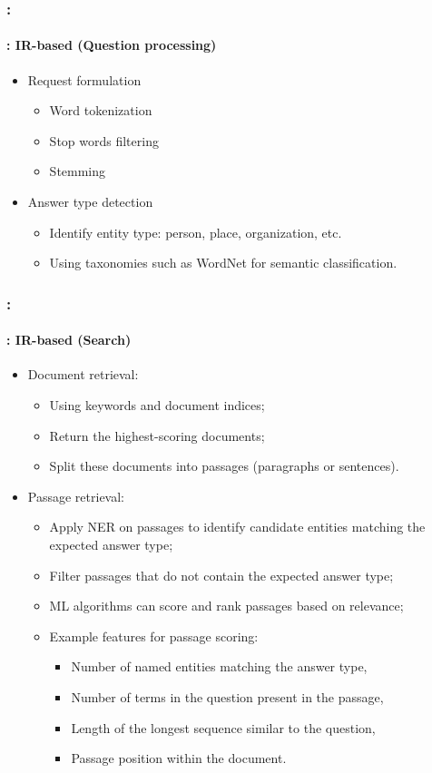 \documentclass[xcolor=table]{beamer}
\begin{document}
\begin{frame}
	\frametitle{\insertshortsubtitle: \insertsection}
	\framesubtitle{\insertsubsection: IR-based (Question processing)}
	
	\begin{itemize}
		\item Request formulation
		\begin{itemize}
			\item Word tokenization
			\item Stop words filtering
			\item Stemming
		\end{itemize}
		\item Answer type detection
		\begin{itemize}
			\item Identify entity type: person, place, organization, etc.
			\item Using taxonomies such as WordNet for semantic classification.
		\end{itemize}
	\end{itemize}
	
\end{frame}

\begin{frame}
	\frametitle{\insertshortsubtitle: \insertsection}
	\framesubtitle{\insertsubsection: IR-based (Search)}
	
	\begin{itemize}
		\item Document retrieval:
		\begin{itemize}
			\item Using keywords and document indices;
			\item Return the highest-scoring documents;
			\item Split these documents into passages (paragraphs or sentences).
		\end{itemize}
		\item Passage retrieval:
		\begin{itemize}
			\item Apply NER on passages to identify candidate entities matching the expected answer type;
			\item Filter passages that do not contain the expected answer type;
			\item ML algorithms can score and rank passages based on relevance;
			\item Example features for passage scoring:
			\begin{itemize}
				\item Number of named entities matching the answer type,
				\item Number of terms in the question present in the passage,
				\item Length of the longest sequence similar to the question,
				\item Passage position within the document.
			\end{itemize}
		\end{itemize}
	\end{itemize}
	
\end{frame}
\end{document}
